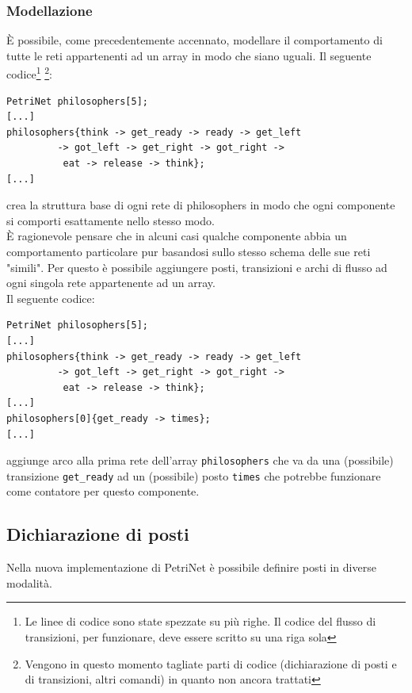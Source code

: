 \documentclass[italian,12pt]{book}
\begin{document}
\subsubsection{Modellazione}
È possibile, come precedentemente accennato, modellare il comportamento di tutte le reti appartenenti ad un 
array in modo che siano uguali. Il seguente codice\footnote{Le linee di codice sono state spezzate su più 
righe. Il codice del flusso di transizioni, per funzionare, deve essere scritto su una riga sola} \footnote{
Vengono in questo momento tagliate parti di codice (dichiarazione di posti e di transizioni, altri comandi) in
quanto non ancora trattati}:
\begin{verbatim}PetriNet philosophers[5];
[...]
philosophers{think -> get_ready -> ready -> get_left 
	     -> got_left -> get_right -> got_right -> 
	      eat -> release -> think};
[...]
\end{verbatim}
crea la struttura base di ogni rete di philosophers in modo che ogni componente si comporti esattamente nello
stesso modo.\\
È ragionevole pensare che in alcuni casi qualche componente abbia un comportamento particolare  pur basandosi 
sullo stesso schema delle sue reti "simili". Per questo è possibile aggiungere posti, transizioni e archi di 
flusso ad ogni singola rete appartenente ad un array.\\
Il seguente codice:
\begin{verbatim}PetriNet philosophers[5];
[...]
philosophers{think -> get_ready -> ready -> get_left 
	     -> got_left -> get_right -> got_right -> 
	      eat -> release -> think};
[...]
philosophers[0]{get_ready -> times};
[...]
\end{verbatim}
aggiunge arco alla prima rete dell'array {\tt philosophers} che va da una (possibile) transizione {\tt get\_ready}
ad un (possibile) posto {\tt times} che potrebbe funzionare come contatore per questo componente.

\subsection{Dichiarazione di posti}\label{ssect:nuovi_posti}
Nella nuova implementazione di PetriNet è possibile definire posti in diverse modalità.\\
\end{document}
